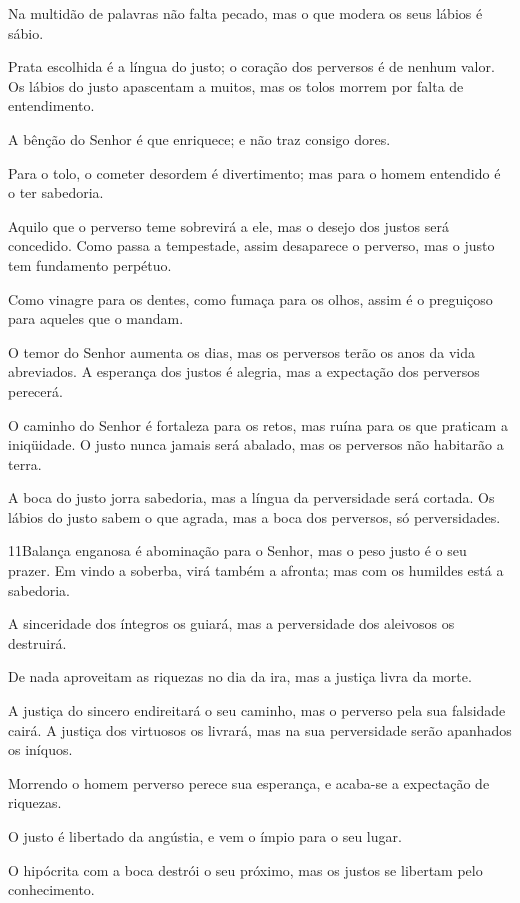 Na multidão de palavras não falta pecado, mas o que modera os
seus lábios é sábio.

Prata escolhida é a língua do justo; o coração dos perversos é de
nenhum valor. Os lábios do justo apascentam a muitos, mas os
tolos morrem por falta de entendimento.

A bênção do Senhor é que enriquece; e não traz consigo dores.

Para o tolo, o cometer desordem é divertimento; mas para o homem
entendido é o ter sabedoria.

Aquilo que o perverso teme sobrevirá a ele, mas o desejo dos
justos será concedido. Como passa a tempestade, assim
desaparece o perverso, mas o justo tem fundamento perpétuo.

Como vinagre para os dentes, como fumaça para os olhos, assim é o
preguiçoso para aqueles que o mandam.

O temor do Senhor aumenta os dias, mas os perversos terão os anos
da vida abreviados. A esperança dos justos é alegria, mas a
expectação dos perversos perecerá.

O caminho do Senhor é fortaleza para os retos, mas ruína para os
que praticam a iniqüidade. O justo nunca jamais será abalado,
mas os perversos não habitarão a terra.

A boca do justo jorra sabedoria, mas a língua da perversidade
será cortada. Os lábios do justo sabem o que agrada, mas a
boca dos perversos, só perversidades.

\medskip

\lettrine{11}{}Balança enganosa é abominação para o Senhor, mas
o peso justo é o seu prazer.  Em vindo a soberba,
virá também a afronta; mas com os humildes está a sabedoria.

A sinceridade dos íntegros os guiará, mas a perversidade dos
aleivosos os destruirá.

De nada aproveitam as riquezas no dia da ira, mas a justiça livra
da morte.

A justiça do sincero endireitará o seu caminho, mas o perverso
pela sua falsidade cairá. A justiça dos virtuosos os livrará,
mas na sua perversidade serão apanhados os iníquos.

Morrendo o homem perverso perece sua esperança, e acaba-se a
expectação de riquezas.

O justo é libertado da angústia, e vem o ímpio para o seu lugar.

O hipócrita com a boca destrói o seu próximo, mas os justos se
libertam pelo conhecimento.

